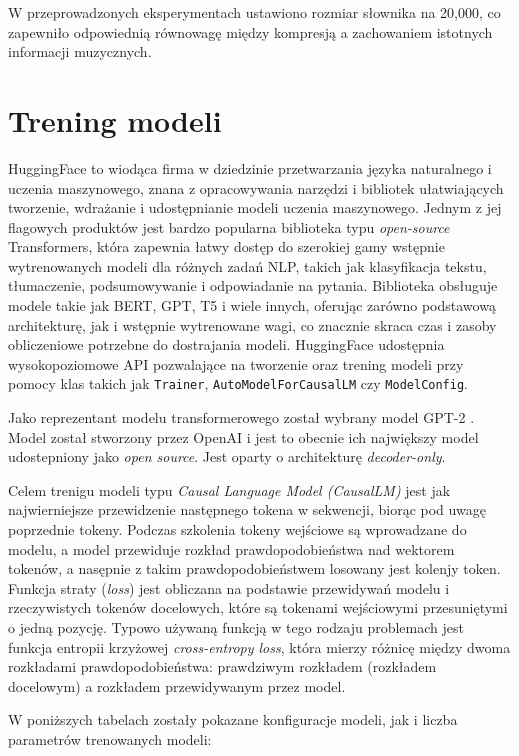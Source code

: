 \documentclass[data-science]{agh-wi} %
\begin{document}
W przeprowadzonych eksperymentach ustawiono rozmiar słownika na 20,000, co zapewniło odpowiednią równowagę między kompresją a zachowaniem istotnych informacji muzycznych.

\section{Trening modeli}
HuggingFace to wiodąca firma w dziedzinie przetwarzania języka naturalnego i uczenia maszynowego, znana z opracowywania narzędzi i bibliotek ułatwiających tworzenie, wdrażanie i udostępnianie modeli uczenia maszynowego. Jednym z jej flagowych produktów jest bardzo popularna biblioteka typu \textit{open-source} Transformers, która zapewnia łatwy dostęp do szerokiej gamy wstępnie wytrenowanych modeli dla różnych zadań NLP, takich jak klasyfikacja tekstu, tłumaczenie, podsumowywanie i odpowiadanie na pytania. Biblioteka obsługuje modele takie jak BERT, GPT, T5 i wiele innych, oferując zarówno podstawową architekturę, jak i wstępnie wytrenowane wagi, co znacznie skraca czas i zasoby obliczeniowe potrzebne do dostrajania modeli. HuggingFace udostępnia wysokopoziomowe API pozwalające na tworzenie oraz trening modeli przy pomocy klas takich jak \texttt{Trainer}, \texttt{AutoModelForCausalLM} czy \texttt{ModelConfig}.

Jako reprezentant modelu transformerowego został wybrany model GPT-2 \cite{gpt2}. Model został stworzony przez OpenAI i jest to obecnie ich największy model udostepniony jako \textit{open source}. Jest oparty o architekturę \textit{decoder-only}.

Celem trenigu modeli typu \textit{Causal Language Model (CausalLM)} jest jak najwierniejsze przewidzenie następnego tokena w sekwencji, biorąc pod uwagę poprzednie tokeny. Podczas szkolenia tokeny wejściowe są wprowadzane do modelu, a model przewiduje rozkład prawdopodobieństwa nad wektorem tokenów, a nasępnie z takim prawdopodobieństwem losowany jest kolenjy token. Funkcja straty (\textit{loss}) jest obliczana na podstawie przewidywań modelu i rzeczywistych tokenów docelowych, które są tokenami wejściowymi przesuniętymi o jedną pozycję. Typowo używaną funkcją w tego rodzaju problemach jest funkcja entropii krzyżowej \textit{cross-entropy loss}, która mierzy różnicę między dwoma rozkładami prawdopodobieństwa: prawdziwym rozkładem (rozkładem docelowym) a rozkładem przewidywanym przez model.

W poniższych tabelach zostały pokazane konfiguracje modeli, jak i liczba parametrów trenowanych modeli:
\end{document}
